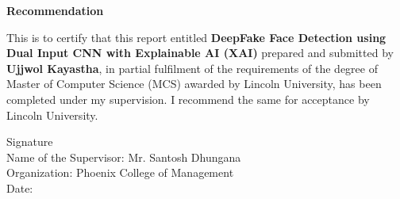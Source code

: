 \pagestyle{plain}
\vspace*{52pt}
\begin{center}
    \large{\textbf{Recommendation}}\\[31pt]
\end{center}

This is to certify that this report entitled \textbf{DeepFake Face Detection using  Dual Input CNN with Explainable AI (XAI)} prepared
and submitted by \textbf{Ujjwol Kayastha}, in partial fulfilment of the requirements of the degree of Master of Computer Science (MCS) awarded by Lincoln University, has been completed under my supervision. I recommend the same for acceptance by Lincoln University.

\vspace{73pt}

\begin{flushleft}
    Signature \\
    Name of the Supervisor: Mr. Santosh Dhungana\\
    Organization: Phoenix College of Management\\
    Date:
\end{flushleft}

